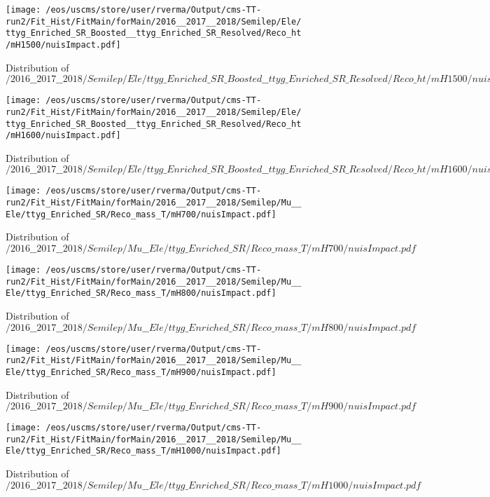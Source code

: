 \begin{figure}
\centering
\texttt{[image: /eos/uscms/store/user/rverma/Output/cms-TT-run2/Fit\_Hist/FitMain/forMain/2016\_\_2017\_\_2018/Semilep/Ele/ttyg\_Enriched\_SR\_Boosted\_\_ttyg\_Enriched\_SR\_Resolved/Reco\_ht/mH1500/nuisImpact.pdf]}
\caption{Distribution of $/2016\_\_2017\_\_2018/Semilep/Ele/ttyg\_Enriched\_SR\_Boosted\_\_ttyg\_Enriched\_SR\_Resolved/Reco\_ht/mH1500/nuisImpact.pdf$}
\end{figure}

\begin{figure}
\centering
\texttt{[image: /eos/uscms/store/user/rverma/Output/cms-TT-run2/Fit\_Hist/FitMain/forMain/2016\_\_2017\_\_2018/Semilep/Ele/ttyg\_Enriched\_SR\_Boosted\_\_ttyg\_Enriched\_SR\_Resolved/Reco\_ht/mH1600/nuisImpact.pdf]}
\caption{Distribution of $/2016\_\_2017\_\_2018/Semilep/Ele/ttyg\_Enriched\_SR\_Boosted\_\_ttyg\_Enriched\_SR\_Resolved/Reco\_ht/mH1600/nuisImpact.pdf$}
\end{figure}

\begin{figure}
\centering
\texttt{[image: /eos/uscms/store/user/rverma/Output/cms-TT-run2/Fit\_Hist/FitMain/forMain/2016\_\_2017\_\_2018/Semilep/Mu\_\_Ele/ttyg\_Enriched\_SR/Reco\_mass\_T/mH700/nuisImpact.pdf]}
\caption{Distribution of $/2016\_\_2017\_\_2018/Semilep/Mu\_\_Ele/ttyg\_Enriched\_SR/Reco\_mass\_T/mH700/nuisImpact.pdf$}
\end{figure}

\begin{figure}
\centering
\texttt{[image: /eos/uscms/store/user/rverma/Output/cms-TT-run2/Fit\_Hist/FitMain/forMain/2016\_\_2017\_\_2018/Semilep/Mu\_\_Ele/ttyg\_Enriched\_SR/Reco\_mass\_T/mH800/nuisImpact.pdf]}
\caption{Distribution of $/2016\_\_2017\_\_2018/Semilep/Mu\_\_Ele/ttyg\_Enriched\_SR/Reco\_mass\_T/mH800/nuisImpact.pdf$}
\end{figure}

\begin{figure}
\centering
\texttt{[image: /eos/uscms/store/user/rverma/Output/cms-TT-run2/Fit\_Hist/FitMain/forMain/2016\_\_2017\_\_2018/Semilep/Mu\_\_Ele/ttyg\_Enriched\_SR/Reco\_mass\_T/mH900/nuisImpact.pdf]}
\caption{Distribution of $/2016\_\_2017\_\_2018/Semilep/Mu\_\_Ele/ttyg\_Enriched\_SR/Reco\_mass\_T/mH900/nuisImpact.pdf$}
\end{figure}

\begin{figure}
\centering
\texttt{[image: /eos/uscms/store/user/rverma/Output/cms-TT-run2/Fit\_Hist/FitMain/forMain/2016\_\_2017\_\_2018/Semilep/Mu\_\_Ele/ttyg\_Enriched\_SR/Reco\_mass\_T/mH1000/nuisImpact.pdf]}
\caption{Distribution of $/2016\_\_2017\_\_2018/Semilep/Mu\_\_Ele/ttyg\_Enriched\_SR/Reco\_mass\_T/mH1000/nuisImpact.pdf$}
\end{figure}

